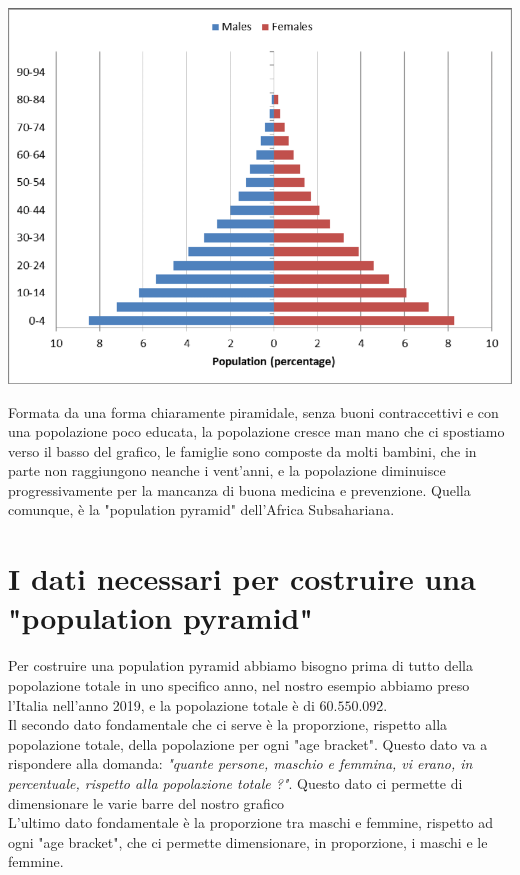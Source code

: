 \documentclass[11pt, oneside]{article}   	%
\begin{document}
\begin{center}
\includegraphics[scale=0.5]{pyramid.png}
\end{center}

Formata da una forma chiaramente piramidale, senza buoni contraccettivi e con una popolazione poco educata, la popolazione cresce man mano che ci spostiamo verso il basso del grafico, le famiglie sono composte da molti bambini, che in parte non raggiungono neanche i vent'anni, e la popolazione diminuisce progressivamente per la mancanza di buona medicina e prevenzione. Quella comunque, è la "population pyramid" dell'Africa Subsahariana.


\section{I dati necessari per costruire una "population pyramid"}
Per costruire una population pyramid abbiamo bisogno prima di tutto della popolazione totale in uno specifico anno, nel nostro esempio abbiamo preso l'Italia nell'anno 2019, e la popolazione totale è di $60.550.092$. \\
Il secondo dato fondamentale che ci serve è la proporzione, rispetto alla popolazione totale, della popolazione per ogni "age bracket". Questo dato va a rispondere alla domanda: \emph{"quante persone, maschio e femmina, vi erano, in percentuale, rispetto alla popolazione totale ?"}. Questo dato ci permette di dimensionare le varie barre del nostro grafico\\
L'ultimo dato fondamentale è la proporzione tra maschi e femmine, rispetto ad ogni "age bracket", che ci permette dimensionare, in proporzione, i maschi e le femmine.
\end{document}
